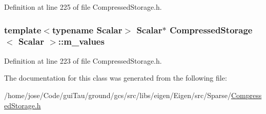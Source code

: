 Definition at line 225 of file Compressed\-Storage.\-h.

\hypertarget{class_compressed_storage_a3458138788eb4353bdb7e29d143e8d93}{
\subsubsection[{m\-\_\-values}]{\setlength{\rightskip}{0pt plus 5cm}template$<$typename Scalar$>$ Scalar$\ast$ {\bf Compressed\-Storage}$<$ Scalar $>$\-::m\-\_\-values\hspace{0.3cm}{\ttfamily [protected]}}}\label{class_compressed_storage_a3458138788eb4353bdb7e29d143e8d93}


Definition at line 223 of file Compressed\-Storage.\-h.



The documentation for this class was generated from the following file\-:\begin{DoxyCompactItemize}
\item 
/home/jose/\-Code/gui\-Tau/ground/gcs/src/libs/eigen/\-Eigen/src/\-Sparse/\hyperlink{_compressed_storage_8h}{Compressed\-Storage.\-h}\end{DoxyCompactItemize}
